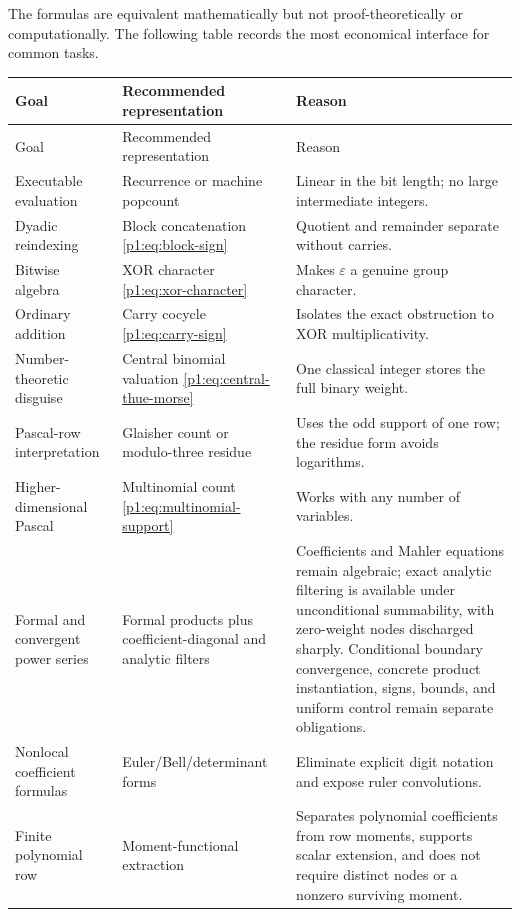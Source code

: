 \documentclass[11pt,oneside]{article}
\numberwithin{equation}{section}
\theoremstyle{definition}
\theoremstyle{remark}
\newcommand{\eps}{\varepsilon}
\begin{document}
The formulas are equivalent mathematically but not proof-theoretically or
computationally.  The following table records the most economical interface
for common tasks.

\renewcommand{\arraystretch}{1.16}
\begin{longtable}{@{}>{\raggedright\arraybackslash}p{}>{\raggedright\arraybackslash}p{}>{\raggedright\arraybackslash}p{}@{}}
\toprule
Goal & Recommended representation & Reason \\
\midrule
\endfirsthead
\toprule
Goal & Recommended representation & Reason \\
\midrule
\endhead
Executable evaluation & Recurrence or machine popcount & Linear in the bit length; no large intermediate integers. \\
Dyadic reindexing & Block concatenation \eqref{p1:eq:block-sign} & Quotient and remainder separate without carries. \\
Bitwise algebra & XOR character \eqref{p1:eq:xor-character} & Makes \(\eps\) a genuine group character. \\
Ordinary addition & Carry cocycle \eqref{p1:eq:carry-sign} & Isolates the exact obstruction to XOR multiplicativity. \\
Number-theoretic disguise & Central binomial valuation \eqref{p1:eq:central-thue-morse} & One classical integer stores the full binary weight. \\
Pascal-row interpretation & Glaisher count or modulo-three residue & Uses the odd support of one row; the residue form avoids logarithms. \\
Higher-dimensional Pascal & Multinomial count \eqref{p1:eq:multinomial-support} & Works with any number of variables. \\
Formal and convergent power series & Formal products plus coefficient-diagonal and analytic filters & Coefficients and Mahler equations remain algebraic; exact analytic filtering is available under unconditional summability, with zero-weight nodes discharged sharply.  Conditional boundary convergence, concrete product instantiation, signs, bounds, and uniform control remain separate obligations. \\
Nonlocal coefficient formulas & Euler/Bell/determinant forms & Eliminate explicit digit notation and expose ruler convolutions. \\
Finite polynomial row & Moment-functional extraction & Separates polynomial coefficients from row moments, supports scalar extension, and does not require distinct nodes or a nonzero surviving moment. \\

\end{longtable}
\end{document}
